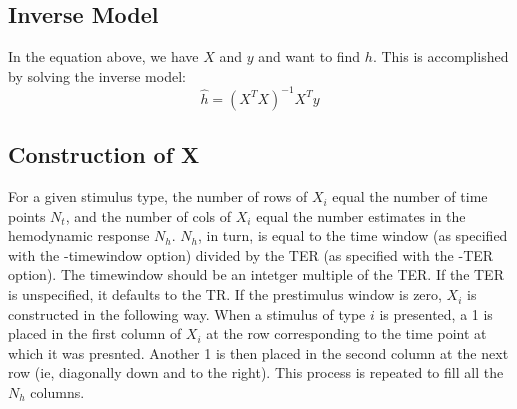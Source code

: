 \documentclass[10pt]{article}
\begin{document}
\subsection{Inverse Model}

In the equation above, we have $X$ and $y$ and want to
find $h$. This is accomplished by solving the inverse model:
\begin{equation}
\hat{h} = (X^T X)^{-1}X^T y
\end{equation}

\subsection{Construction of X}

For a given stimulus type, the number of rows of $X_i$ equal the
number of time points $N_t$, and the number of cols of $X_i$ equal the
number estimates in the hemodynamic response $N_h$. $N_h$, in turn, is
equal to the time window (as specified with the -timewindow option)
divided by the TER (as specified with the -TER option). The timewindow
should be an intetger multiple of the TER. If the TER is unspecified,
it defaults to the TR. If the prestimulus window is zero, $X_i$ is
constructed in the following way. When a stimulus of type $i$ is
presented, a 1 is placed in the first column of $X_i$ at the row
corresponding to the time point at which it was presnted. Another 1 is
then placed in the second column at the next row (ie, diagonally down
and to the right). This process is repeated to fill all the $N_h$
columns. 
\end{document}
